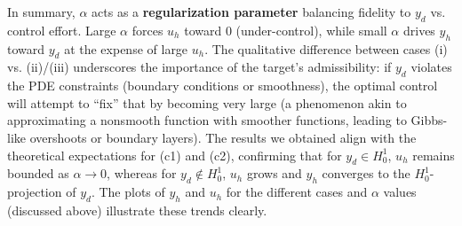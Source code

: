 \documentclass[a4paper,10pt]{article}
\begin{document}
In summary, \(\alpha\) acts as a \textbf{regularization parameter} balancing fidelity to \(y_d\) vs. control effort.
Large \(\alpha\) forces \(u_h\) toward 0 (under-control), while small \(\alpha\) drives \(y_h\) toward \(y_d\) at the expense of large \(u_h\). The qualitative difference between cases (i) vs. (ii)/(iii) underscores the importance of the target's admissibility: if \(y_d\) violates the PDE constraints (boundary conditions or smoothness), the optimal control will attempt to “fix” that by becoming very large (a phenomenon akin to approximating a nonsmooth function with smoother functions, leading to Gibbs-like overshoots or boundary layers). The results we obtained align with the theoretical expectations for (c1) and (c2), confirming that for \(y_d\in H^1_0\), \(u_h\) remains bounded as \(\alpha\to 0\), whereas for \(y_d\notin H^1_0\), \(u_h\) grows and \(y_h\) converges to the \(H^1_0\)-projection of \(y_d\).
The plots of \(y_h\) and \(u_h\) for the different cases and \(\alpha\) values (discussed above) illustrate these trends clearly.
\end{document}
